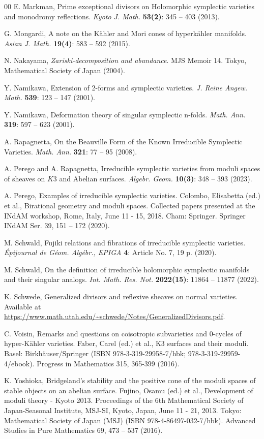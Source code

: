 \documentclass[12pt,reqno]{amsart}
\theoremstyle{plain}
\theoremstyle{definition}
\begin{document}
\begin{thebibliography}{00}
E. Markman, Prime exceptional divisors on Holomorphic symplectic varieties and monodromy reflections. \textit{Kyoto J. Math.} \textbf{53(2)}: 345 -- 403 (2013).

G. Mongardi, A note on the K\"ahler and Mori cones of hyperk\"ahler manifolds.
\textit{Asian J. Math.} \textbf{19(4)}: 583 -- 592 (2015).

N. Nakayama, \textit{Zariski-decomposition and abundance}. MJS Memoir 14. Tokyo, Mathematical Society of Japan (2004).

Y. Namikawa, Extension of 2-forms and symplectic varieties. \textit{J. Reine Angew. Math.} \textbf{539}: 123 -- 147 (2001).

Y. Namikawa, Deformation theory of singular symplectic n-folds. \textit{Math. Ann.} \textbf{319}: 597 -- 623 (2001). 

A. Rapagnetta, On the Beauville Form of the Known Irreducible Symplectic Varieties. \textit{Math. Ann.} \textbf{321}: 77 -- 95 (2008).

A. Perego and A. Rapagnetta, Irreducible symplectic varieties from moduli spaces of sheaves on $K3$ and Abelian surfaces. \textit{Algebr. Geom.} \textbf{10(3)}: 348 -- 393 (2023).

A. Perego, Examples of irreducible symplectic varieties. Colombo, Elisabetta (ed.) et al., Birational geometry and moduli spaces. Collected papers presented at the INdAM workshop, Rome, Italy, June 11 - 15, 2018. Cham: Springer. Springer INdAM Ser. 39, 151 -- 172 (2020). 

M. Schwald, Fujiki relations and fibrations of irreducible symplectic varieties. 
\textit{\'Epijournal de G\'eom. Alg\'ebr., EPIGA} \textbf{4}: Article No. 7, 19 p. (2020).

M. Schwald, On the definition of irreducible holomorphic symplectic manifolds and their singular analogs. \textit{Int. Math. Res. Not.} \textbf{2022(15)}: 11864 -- 11877 (2022).

K. Schwede, Generalized divisors and reflexive sheaves on normal varieties. Available at \url{https://www.math.utah.edu/~schwede/Notes/GeneralizedDivisors.pdf}.

C. Voisin, Remarks and questions on coisotropic subvarieties and 0-cycles of hyper-K\"ahler varieties. Faber, Carel (ed.) et al., K3 surfaces and their moduli. Basel: Birkhäuser/Springer (ISBN 978-3-319-29958-7/hbk; 978-3-319-29959-4/ebook). Progress in Mathematics 315, 365-399 (2016).

K. Yoshioka, Bridgeland's stability and the positive cone of the moduli spaces of stable objects on an abelian surface. Fujino, Osamu (ed.) et al., Development of moduli theory - Kyoto 2013. Proceedings of the 6th Mathematical Society of Japan-Seasonal Institute, MSJ-SI, Kyoto, Japan, June 11 - 21, 2013. Tokyo: Mathematical Society of Japan (MSJ) (ISBN 978-4-86497-032-7/hbk). Advanced Studies in Pure Mathematics 69, 473 -- 537 (2016).

\end{thebibliography}
\end{document}
